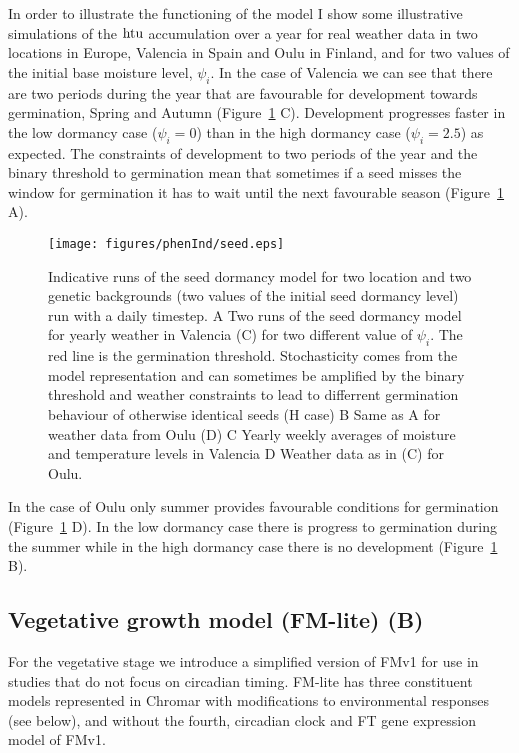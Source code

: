In order to illustrate the functioning of the model I show some illustrative
simulations of the $\mathrm{htu}$ accumulation over a year for real weather data in
two locations in Europe, Valencia in Spain and Oulu in Finland, and for two
values of the initial base moisture level, $\psi_i$. In the case of Valencia we
can see that there are two periods during the year that are favourable for
development towards germination, Spring and Autumn (Figure~\ref{fig:seedInd}
C). Development progresses faster in the low dormancy case ($\psi_i=0$) than in
the high dormancy case ($\psi_i=2.5$) as expected. The constraints of
development to two periods of the year and the binary threshold to germination
mean that sometimes if a seed misses the window for germination it has to wait
until the next favourable season (Figure~\ref{fig:seedInd} A).
\begin{figure}[tb]
  \centering
  \texttt{[image: figures/phenInd/seed.eps]}
  \caption{Indicative runs of the seed dormancy model for two location and two
    genetic backgrounds (two values of the initial seed dormancy level) run with
    a daily timestep. A Two runs of the seed dormancy model for yearly weather
    in Valencia (C) for two different value of $\psi_i$. The red line is the
    germination threshold. Stochasticity comes from the model representation and
    can sometimes be amplified by the binary threshold and weather constraints
    to lead to differrent germination behaviour of otherwise identical seeds (H
    case) B Same as A for weather data from Oulu (D) C Yearly weekly averages of
    moisture and temperature levels in Valencia D Weather data as in (C) for
    Oulu.  }
  \label{fig:seedInd}
\end{figure}

In the case of Oulu only summer provides favourable conditions for germination
(Figure~\ref{fig:seedInd} D). In the low dormancy case there is progress to
germination during the summer while in the high dormancy case there is no
development (Figure~\ref{fig:seedInd} B).

\subsection{Vegetative growth model (FM-lite) (B)}
\label{subsec:fm-lite}
For the vegetative stage we introduce a simplified version of FMv1
\citep{chew_multiscale_2014} for use in studies that do not focus on circadian
timing. FM-lite has three constituent models represented in Chromar with
modifications to environmental responses (see below), and without the fourth,
circadian clock and FT gene expression model of FMv1.

